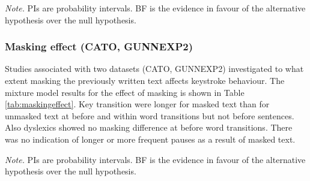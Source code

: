 \begin{appendix}
\begin{table}[tbp]
\begin{center}
\begin{threeparttable}
{}

\begin{tablenotes}[para]
\normalsize{\textit{Note.} PIs are probability intervals. BF is the evidence in favour of the alternative hypothesis over the null hypothesis.}
\end{tablenotes}

\end{threeparttable}
\end{center}

\end{table}

\hypertarget{masking-effect-cato-gunnexp2}{%
\subsubsection{Masking effect (CATO,
GUNNEXP2)}\label{masking-effect-cato-gunnexp2}}

Studies associated with two datasets (CATO, GUNNEXP2) investigated to
what extent masking the previously written text affects keystroke
behaviour. The mixture model results for the effect of masking is shown
in Table \ref{tab:maskingeffect}. Key transition were longer for masked
text than for unmasked text at before and within word transitions but
not before sentences. Also dyslexics showed no masking difference at
before word transitions. There was no indication of longer or more
frequent pauses as a result of masked text.

\blandscape

\begin{center}
\begin{ThreePartTable}

\begin{TableNotes}[para]
\normalsize{\textit{Note.} PIs are probability intervals. BF is the evidence in favour of the alternative hypothesis over the null hypothesis.}
\end{TableNotes}

\footnotesize{

}
\end{ThreePartTable}
\end{center}
\end{appendix}
